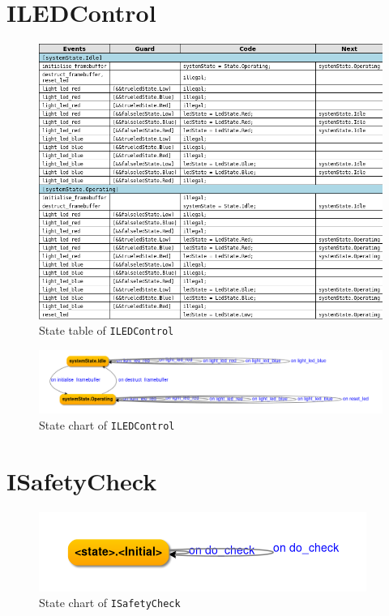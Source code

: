 \documentclass[12pt]{scrreprt}
\begin{document}
\begin{appendices}
\section{ILEDControl}
\begin{figure}[H]
    \centering
    \includegraphics[width=\textwidth]{Figures/results/modelling_figures/ILEDControl/ILEDControl_state_table.png}
    \caption{State table of \texttt{ILEDControl}}
    \label{fig:ILEDControl_state_table}
\end{figure}

\begin{figure}[H]
    \centering
    \includegraphics[width=\textwidth]{Figures/results/modelling_figures/ILEDControl/ILEDControlStateChart.png}
    \caption{State chart of \texttt{ILEDControl}}
    \label{fig:ILEDControl_state_chart}
\end{figure}

\section{ISafetyCheck}

\begin{figure}[H]
    \centering
    \includegraphics[width=\textwidth]{Figures/results/modelling_figures/ISafetyCheck/ISafetyCheck_state_chart.png}
    \caption{State chart of \texttt{ISafetyCheck}}
    \label{fig:ISafetyCheck_state_chart}
\end{figure}


\end{appendices}
\end{document}
